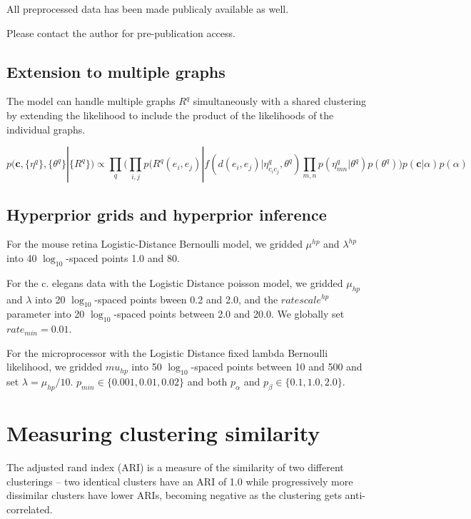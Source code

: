 \documentclass{article}
\renewcommand{\vec}[1]{\mathbf{#1}}
\begin{document}
All preprocessed data has been made publicaly available as well. 

Please contact the author for pre-publication access. 

\subsection*{Extension to multiple graphs}
\label{supp:multigraph}
The model can handle multiple graphs $R^q$ simultaneously with a shared clustering by extending the likelihood to include the product of the likelihoods of the individual graphs. 

\begin{equation}
  p(\vec{c}, \{\eta^q\}, \{\theta^q\} | \{R^q\} ) \propto \prod_q \Bigg(\prod_{i, j} p(R^q(e_i, e_j) | f(d(e_i, e_j) | \eta^q_{c_ic_j}, \theta^q) \prod_{m, n} p(\eta^q_{mn} | \theta^q)  p(\theta^q) \Bigg) p(\vec{c} | \alpha) p(\alpha) 
\end{equation}

\FloatBarrier
\subsection*{Hyperprior grids and hyperprior inference}
\label{supp:hyperpriors}

For the mouse retina Logistic-Distance Bernoulli model, we gridded
$\mu^{hp}$ and $\lambda^{hp}$ into 40 $\log_{10}$-spaced points 1.0
and 80. 

For the c. elegans data with the Logistic Distance poisson model, we
gridded $\mu_{hp}$ and $\lambda$ into 20 $\log_{10}$-spaced points
bween 0.2 and 2.0, and the $ratescale^{hp}$ parameter into 20
$\log_{10}$-spaced points between 2.0 and 20.0. We globally set
$rate_{min}=0.01$.

For the microprocessor with the Logistic Distance fixed lambda
Bernoulli likelihood, we gridded $mu_{hp}$ into 50 $\log_{10}$-spaced
points between 10 and 500 and set $\lambda=\mu_{hp}/10$. $p_{min} \in
\{0.001, 0.01, 0.02\}$ and both $p_\alpha$ and $p_\beta \in \{0.1,
1.0, 2.0\}$.

\section*{Measuring clustering similarity}

The adjusted rand index (ARI) is a measure of the similarity of two
different clusterings \autocite{Hubert1985} -- two identical clusters
have an ARI of 1.0 while progressively more dissimilar clusters have
lower ARIs, becoming negative as the clustering gets anti-correlated.
\end{document}
